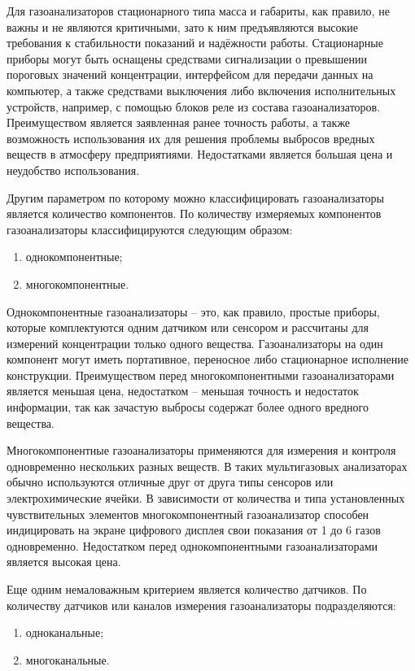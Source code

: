 \documentclass[14pt, a4paper]{extreport}
\begin{document}
	Для газоанализаторов стационарного типа масса и габариты, как правило, не важны и не являются критичными, зато к ним предъявляются высокие требования к стабильности показаний и надёжности работы. Стационарные приборы могут быть оснащены средствами сигнализации о превышении пороговых значений концентрации, интерфейсом для передачи данных на компьютер, а также средствами выключения либо включения исполнительных устройств, например, с помощью блоков реле из состава газоанализаторов. Преимуществом является заявленная ранее точность работы, а также возможность использования их для решения проблемы выбросов вредных веществ в атмосферу предприятиями. Недостатками является большая цена и неудобство использования.
	
	Другим параметром по которому можно классифицировать газоанализаторы является количество компонентов. По количеству измеряемых компонентов газоанализаторы классифицируются следующим образом:
	\begin{enumerate}[label={\arabic*)}]
		\item однокомпонентные;
		\item многокомпонентные.
	\end{enumerate}

	Однокомпонентные газоанализаторы -- это, как правило, простые приборы, которые комплектуются одним датчиком или сенсором и рассчитаны для измерений концентрации только одного вещества. Газоанализаторы на один компонент могут иметь портативное, переносное либо стационарное исполнение конструкции. Преимуществом перед многокомпонентными газоанализаторами является меньшая цена, недостатком -- меньшая точность и недостаток информации, так как зачастую выбросы содержат более одного вредного вещества.
	
	Многокомпонентные газоанализаторы применяются для измерения и контроля одновременно нескольких разных веществ. В таких мультигазовых анализаторах обычно используются отличные друг от друга типы сенсоров или электрохимические ячейки. В зависимости от количества и типа установленных чувствительных элементов многокомпонентный газоанализатор способен индицировать на экране цифрового дисплея свои показания от 1 до 6 газов одновременно. Недостатком перед однокомпонентными газоанализаторами является высокая цена.
	
	Еще одним немаловажным критерием является количество датчиков. По количеству датчиков или каналов измерения газоанализаторы подразделяются:
	\begin{enumerate}[label={\arabic*)}]
		\item одноканальные;
		\item многоканальные.
	\end{enumerate}
\end{document}
